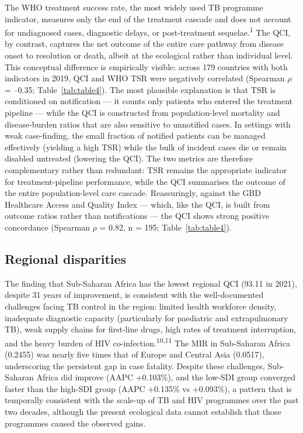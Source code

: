 \documentclass[12pt]{article}
\begin{document}
The WHO treatment success rate, the most widely used TB programme indicator, measures only the end of the treatment cascade and does not account for undiagnosed cases, diagnostic delays, or post-treatment sequelae.\textsuperscript{1} The QCI, by contrast, captures the net outcome of the entire care pathway from disease onset to resolution or death, albeit at the ecological rather than individual level. This conceptual difference is empirically visible: across 179 countries with both indicators in 2019, QCI and WHO TSR were negatively correlated (Spearman $\rho$ = --0.35; Table~\ref{tab:table4}). The most plausible explanation is that TSR is conditioned on notification --- it counts only patients who entered the treatment pipeline --- while the QCI is constructed from population-level mortality and disease-burden ratios that are also sensitive to unnotified cases. In settings with weak case-finding, the small fraction of notified patients can be managed effectively (yielding a high TSR) while the bulk of incident cases die or remain disabled untreated (lowering the QCI). The two metrics are therefore complementary rather than redundant: TSR remains the appropriate indicator for treatment-pipeline performance, while the QCI summarises the outcome of the entire population-level care cascade. Reassuringly, against the GBD Healthcare Access and Quality Index --- which, like the QCI, is built from outcome ratios rather than notifications --- the QCI shows strong positive concordance (Spearman $\rho$ = 0.82, n = 195; Table~\ref{tab:table4}).

\subsection{Regional disparities}

The finding that Sub-Saharan Africa has the lowest regional QCI (93.11 in 2021), despite 31 years of improvement, is consistent with the well-documented challenges facing TB control in the region: limited health workforce density, inadequate diagnostic capacity (particularly for paediatric and extrapulmonary TB), weak supply chains for first-line drugs, high rates of treatment interruption, and the heavy burden of HIV co-infection.\textsuperscript{10,11} The MIR in Sub-Saharan Africa (0.2455) was nearly five times that of Europe and Central Asia (0.0517), underscoring the persistent gap in case fatality. Despite these challenges, Sub-Saharan Africa did improve (AAPC +0.103\%), and the low-SDI group converged faster than the high-SDI group (AAPC +0.135\% vs +0.093\%), a pattern that is temporally consistent with the scale-up of TB and HIV programmes over the past two decades, although the present ecological data cannot establish that those programmes caused the observed gains.
\end{document}
